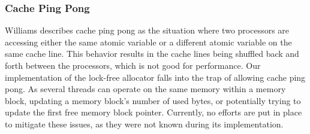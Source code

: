 \subsubsection{Cache Ping Pong}
\label{par:detailed_lock_free_ping_pong}
Williams\cite{williams_safety_off} describes cache ping pong as the situation where two processors are accessing either the same atomic variable or a different atomic variable on the same cache line.
This behavior results in the cache lines being shuffled back and forth between the processors, which is not good for performance.
Our implementation of the lock-free allocator falls into the trap of allowing cache ping pong.
As several threads can operate on the same memory within a memory block, updating a memory block's number of used bytes, or
potentially trying to update the first free memory block pointer.
Currently, no efforts are put in place to mitigate these issues, as they were not known during its implementation.
